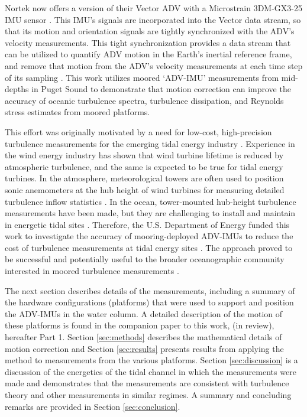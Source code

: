 Nortek now offers a version of their Vector ADV with a Microstrain 3DM-GX3-25 IMU sensor \cite[]{vector_manual2005, MicroStrain2012a}. This IMU's signals are incorporated into the Vector data stream, so that its motion and orientation signals are tightly synchronized with the ADV's velocity measurements. This tight synchronization provides a data stream that can be utilized to quantify ADV motion in the Earth's inertial reference frame, and remove that motion from the ADV's velocity measurements at each time step of its sampling \cite[]{Edson++1998}. This work utilizes moored `ADV-IMU' measurements from mid-depths in Puget Sound to demonstrate that motion correction can improve the accuracy of oceanic turbulence spectra, turbulence dissipation, and Reynolds stress estimates from moored platforms.

This effort was originally motivated by a need for low-cost, high-precision turbulence measurements for the emerging tidal energy industry \cite[]{Mccaffrey++2015, Alexander+Hamlington2015}. Experience in the wind energy industry has shown that wind turbine lifetime is reduced by atmospheric turbulence, and the same is expected to be true for tidal energy turbines. In the atmosphere, meteorological towers are often used to position sonic anemometers at the hub height of wind turbines for measuring detailed turbulence inflow statistics \cite[]{Hand++2003, Kelley++2005, Mucke++2011, Afgan++2013}. In the ocean, tower-mounted hub-height turbulence measurements have been made, but they are challenging to install and maintain in energetic tidal sites \cite[]{Gunawan++2014,Thomson++2012}. Therefore, the U.S. Department of Energy funded this work to investigate the accuracy of mooring-deployed ADV-IMUs to reduce the cost of turbulence measurements at tidal energy sites \cite[]{Kilcher++2016}. The approach proved to be successful and potentially useful to the broader oceanographic community interested in moored turbulence measurements \cite[]{Lueck+Huang1999, Doherty++1999, Nash++2004, Perlin+Moum2012, Alford2010, Paskyabi+Fer2013}.

The next section describes details of the measurements, including a summary of the hardware configurations (platforms) that were used to support and position the ADV-IMUs in the water column. A detailed description of the motion of these platforms is found in the companion paper to this work, \citeauthor{Harding++2017} (in review), hereafter Part 1. Section \ref{sec:methods} describes the mathematical details of motion correction and Section \ref{sec:results} presents results from applying the method to measurements from the various platforms. Section \ref{sec:discussion} is a discussion of the energetics of the tidal channel in which the measurements were made and demonstrates that the measurements are consistent with turbulence theory and other measurements in similar regimes. A summary and concluding remarks are provided in Section \ref{sec:conclusion}.


